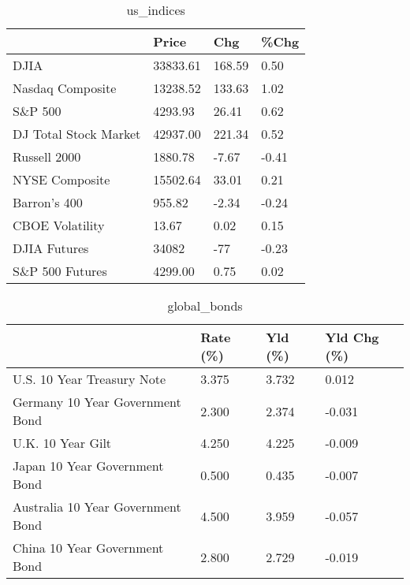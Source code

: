 \documentclass{article}%
\begin{document}
%


\begin{table}[htbp]%
\caption{us\_indices}%
\centering%
\begin{adjustbox}{width=1\textwidth}%
\begin{tabular}{llll}
\toprule
                      &    Price &    Chg &  \%Chg \\
\midrule
                 DJIA & 33833.61 & 168.59 &  0.50 \\
     Nasdaq Composite & 13238.52 & 133.63 &  1.02 \\
              S\&P 500 &  4293.93 &  26.41 &  0.62 \\
DJ Total Stock Market & 42937.00 & 221.34 &  0.52 \\
         Russell 2000 &  1880.78 &  -7.67 & -0.41 \\
       NYSE Composite & 15502.64 &  33.01 &  0.21 \\
         Barron's 400 &   955.82 &  -2.34 & -0.24 \\
      CBOE Volatility &    13.67 &   0.02 &  0.15 \\
         DJIA Futures &    34082 &    -77 & -0.23 \\
      S\&P 500 Futures &  4299.00 &   0.75 &  0.02 \\
\bottomrule
\end{tabular}
%
\end{adjustbox}%
\end{table}

%


\begin{table}[htbp]%
\caption{global\_bonds}%
\centering%
\begin{adjustbox}{width=1\textwidth}%
\begin{tabular}{llll}
\toprule
                                  & Rate (\%) & Yld (\%) & Yld Chg (\%) \\
\midrule
       U.S. 10 Year Treasury Note &    3.375 &   3.732 &       0.012 \\
  Germany 10 Year Government Bond &    2.300 &   2.374 &      -0.031 \\
                U.K. 10 Year Gilt &    4.250 &   4.225 &      -0.009 \\
    Japan 10 Year Government Bond &    0.500 &   0.435 &      -0.007 \\
Australia 10 Year Government Bond &    4.500 &   3.959 &      -0.057 \\
    China 10 Year Government Bond &    2.800 &   2.729 &      -0.019 \\
\bottomrule
\end{tabular}
%
\end{adjustbox}%
\end{table}
\end{document}
